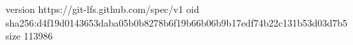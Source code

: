 version https://git-lfs.github.com/spec/v1
oid sha256:d4f19d0143653daba05b0b8278b6f19b66b06b9b17edf74b22c131b53d03d7b5
size 113986
